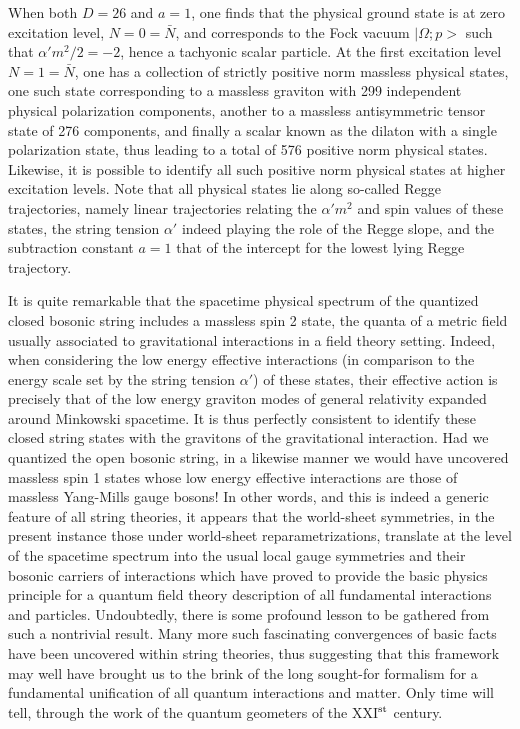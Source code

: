 \documentclass[a4paper,11pt]{article}
\begin{document}
When both $D=26$ and $a=1$, one finds that the physical 
ground state is at zero excitation level, $N=0=\bar{N}$, and corresponds
to the Fock vacuum $|\Omega;p>$ such that $\alpha' m^2/2=-2$, hence a
tachyonic scalar particle. At the first excitation level $N=1=\bar{N}$,
one has a collection of strictly positive norm massless physical states,
one such state corresponding to a massless graviton with 299 independent
physical polarization components, another to a massless antisymmetric
tensor state of 276 components, and finally a scalar known as the dilaton
with a single polarization state, thus leading to a total of 576 positive norm
physical states. Likewise, it is possible to identify all such positive
norm physical states at higher excitation levels. Note that all physical
states lie along so-called Regge trajectories, namely linear trajectories
relating the $\alpha' m^2$ and spin values of these states, the string tension
$\alpha'$ indeed playing the role of the Regge slope, and the subtraction
constant $a=1$ that of the intercept for the lowest lying Regge trajectory.

It is quite remarkable that the spacetime physical spectrum
of the quantized closed bosonic string includes a massless spin 2 state,
the quanta of a metric field usually associated to gravitational interactions
in a field theory setting. Indeed, when considering the low energy effective
interactions (in comparison to the energy scale set by the string tension
$\alpha'$) of these states, their effective action is precisely that of
the low energy graviton modes of ge\-ne\-ral relativity expanded around 
Minkowski spacetime.\cite{Pol,GSW} It is thus perfectly consistent to 
identify these
closed string states with the gravitons of the gra\-vi\-ta\-tio\-nal 
interaction. Had we quantized the open bosonic string, in a likewise manner 
we would have uncovered massless spin 1 states whose low energy effective 
interactions are those of massless Yang-Mills gauge bosons! In other words, 
and this is indeed a generic feature of all string theories, it appears that 
the world-sheet symmetries, in the present instance those under world-sheet
reparametrizations, translate at the level of the spacetime spectrum into
the usual local gauge symmetries and their bosonic carriers of interactions
which have proved to provide the basic physics principle for a quantum
field theory description of all fundamental interactions and particles.
Undoubtedly, there is some profound lesson to be gathered from such a
nontrivial result. Many more such fascinating convergences of basic facts
have been uncovered within string theories, thus suggesting that this 
framework may well have brought us to the brink of the long sought-for 
formalism for a fundamental unification of all quantum interactions and 
matter. Only time will tell, through the work of the quantum geometers of 
the XXI$^{\rm st}$ century.
\end{document}
